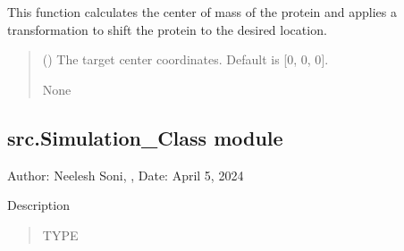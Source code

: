 \documentclass[letterpaper,10pt,english]{sphinxmanual}
\begin{document}
\begin{fulllineitems}
\begin{fulllineitems}
\sphinxAtStartPar
This function calculates the center of mass of the protein and applies
a transformation to shift the protein to the desired location.
\begin{quote}\begin{description}
\sphinxAtStartPar
{} (\sphinxstyleliteralemphasis{\sphinxupquote{, }}) \textendash{} The target center coordinates. Default is {[}0, 0, 0{]}.

\sphinxAtStartPar
None

\end{description}\end{quote}

\end{fulllineitems}


\end{fulllineitems}



\subsection{src.Simulation\_Class module}
\label{\detokenize{src:module-src.Simulation_Class}}\label{\detokenize{src:src-simulation-class-module}}
\sphinxAtStartPar
Author: Neelesh Soni, , 
Date: April 5, 2024

\begin{fulllineitems}
\label{\detokenize{src:src.Simulation_Class.logger}}
\pysigstartsignatures
{}
\pysigstopsignatures
\sphinxAtStartPar
Description
\begin{quote}\begin{description}
\sphinxAtStartPar
TYPE

\end{description}\end{quote}

\end{fulllineitems}
\end{document}
